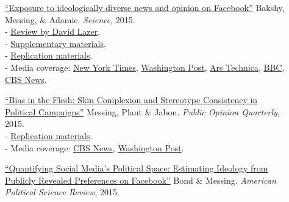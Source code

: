 \documentclass[letterpaper,11pt]{article}
\begin{document}
\begin{description}
\item[] \href{https://dl.dropboxusercontent.com/u/25710348/Science-2015-Bakshy-1130-2.pdf}{``Exposure to ideologically diverse news and opinion on Facebook''} Bakshy, Messing, \& Adamic.
\emph{Science}, 2015.  \\
- \href{http://science.sciencemag.org/content/348/6239/1090}{Review by David Lazer}. \\
- \href{http://science.sciencemag.org/content/sci/suppl/2015/05/06/science.aaa1160.DC1/Bakshy-SM.revision.1.pdf}{Supplementary materials}. \\
- \href{http://dx.doi.org/10.7910/DVN/LDJ7MS}{Replication materials}. \\
- Media coverage: \href{http://www.nytimes.com/2015/05/08/technology/facebook-study-disputes-theory-of-political-polarization-among-users.html}{New York Times}, \href{http://www.washingtonpost.com/news/energy-environment/wp/2015/05/07/facebook-study-says-its-mainly-your-fault-not-theirs-that-you-read-things-you-already-agree-with/}{Washington Post}, \href{https://arstechnica.com/science/2015/05/dont-just-blame-facebook-we-build-our-own-bubbles/}{Ars Technica}, \href{http://www.bbc.com/news/science-environment-32606724}{BBC}, \href{http://www.cbsnews.com/news/facebooks-news-feed-limits-your-world-view/}{CBS News}.

\item[] \href{https://www.dropbox.com/s/et4rnj2duzsuhiq/HSVmetricsCampaignsDarknessPOQFINAL.pdf?raw=true}{``Bias in the Flesh: Skin Complexion and Stereotype Consistency in Political Campaigns''} Messing, Plaut \& Jabon.
 \emph{Public Opinion Quarterly}, 2015. \\
- \href{https://dataverse.harvard.edu/dataset.xhtml?persistentId=doi:10.7910/DVN/F0NDJP}{Replication materials}. \\
- Media coverage: \href{http://www.cbsnews.com/news/study-2008-mccain-attack-ads-darkened-obama-skin-tone/}{CBS News}, \href{https://www.washingtonpost.com/news/wonk/wp/2015/12/29/obamas-skin-looks-a-little-different-in-these-gop-campaign-ads/}{Washington Post}. 

\item[] \href{https://dl.dropboxusercontent.com/u/25710348/EstimatingIdeologyFromFacebookPageLikes.pdf}{``Quantifying Social Media's Political Space: Estimating Ideology from Publicly Revealed Preferences on Facebook''} Bond \& Messing. 
\emph{American Political Science Review}, 2015.


\end{description}
\end{document}
